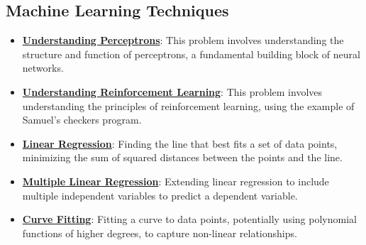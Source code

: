\documentclass{article}%
\begin{document}
%
\subsection{Machine Learning Techniques}%
\label{subsec:MachineLearningTechniques}%
\begin{itemize}[leftmargin=*]%
\item \href{\url{https://purdue.brightspace.com/d2l/common/assets/pdfjs-d2l-dist/1.0.14-legacy/web/viewer.html?file=\%252Fcontent\%252Fenforced\%252F1095467-wl.202510.CS.24300.001\%252F02L2-Intro.pdf\%253Fou\%253D1095467\&lang=en-us\&container=d2l-fileviewer-rendered-pdf\&fullscreen=d2l-fileviewer-rendered-pdf-dialog\&height=667}#page=45}{\textbf{Understanding Perceptrons}}: This problem involves understanding the structure and function of perceptrons, a fundamental building block of neural networks.%
\item \href{\url{https://purdue.brightspace.com/d2l/common/assets/pdfjs-d2l-dist/1.0.14-legacy/web/viewer.html?file=\%252Fcontent\%252Fenforced\%252F1095467-wl.202510.CS.24300.001\%252F02L2-Intro.pdf\%253Fou\%253D1095467\&lang=en-us\&container=d2l-fileviewer-rendered-pdf\&fullscreen=d2l-fileviewer-rendered-pdf-dialog\&height=667}#page=46}{\textbf{Understanding Reinforcement Learning}}: This problem involves understanding the principles of reinforcement learning, using the example of Samuel's checkers program.%
\item \href{\url{https://purdue.brightspace.com/d2l/common/assets/pdfjs-d2l-dist/1.0.14-legacy/web/viewer.html?file=\%252Fcontent\%252Fenforced\%252F1095467-wl.202510.CS.24300.001\%252F05L2-ML\%20Basics.pdf\%253Fou\%253D1095467\&lang=en-us\&container=d2l-fileviewer-rendered-pdf\&fullscreen=d2l-fileviewer-rendered-pdf-dialog\&height=667}#page=6}{\textbf{Linear Regression}}: Finding the line that best fits a set of data points, minimizing the sum of squared distances between the points and the line.%
\item \href{\url{https://purdue.brightspace.com/d2l/common/assets/pdfjs-d2l-dist/1.0.14-legacy/web/viewer.html?file=\%252Fcontent\%252Fenforced\%252F1095467-wl.202510.CS.24300.001\%252F05L2-ML\%20Basics.pdf\%253Fou\%253D1095467\&lang=en-us\&container=d2l-fileviewer-rendered-pdf\&fullscreen=d2l-fileviewer-rendered-pdf-dialog\&height=667}#page=11}{\textbf{Multiple Linear Regression}}: Extending linear regression to include multiple independent variables to predict a dependent variable.%
\item \href{\url{https://purdue.brightspace.com/d2l/common/assets/pdfjs-d2l-dist/1.0.14-legacy/web/viewer.html?file=\%252Fcontent\%252Fenforced\%252F1095467-wl.202510.CS.24300.001\%252F05L2-ML\%20Basics.pdf\%253Fou\%253D1095467\&lang=en-us\&container=d2l-fileviewer-rendered-pdf\&fullscreen=d2l-fileviewer-rendered-pdf-dialog\&height=667}#page=13}{\textbf{Curve Fitting}}: Fitting a curve to data points, potentially using polynomial functions of higher degrees, to capture non-linear relationships.%

\end{itemize}
\end{document}
